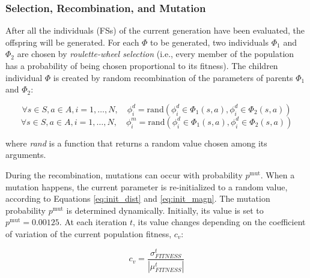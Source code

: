 \documentclass[a4paper]{llncs}
\begin{document}
\subsubsection{Selection, Recombination, and Mutation}
\label{subsubsec:GA_Selection_Recombination_Mutation}
After all the individuals (FSs) of the current generation have been evaluated, the offspring will be generated. For each $\Phi$ to be generated, two individuals $\Phi_1$ and $\Phi_2$ are chosen by \textit{roulette-wheel selection}  (i.e., every member of the population has a probability of being chosen proportional to its fitness). The children individual $\Phi$ is created by random recombination of the parameters of parents $\Phi_1$ and $\Phi_2$:
\begin{small}
\begin{equation}
\forall s \in S, a \in A,  i = 1, \ldots, N, \quad \phi^d_i  = \mathrm{rand}(\phi^d_i \in \Phi_1(s,a), \phi^d_i \in \Phi_2(s,a))
\end{equation}
\begin{equation}
\forall s \in S, a \in A,  i = 1, \ldots, N, \quad \phi^m_i = \mathrm{rand}(\phi^d_i \in \Phi_1(s,a), \phi^d_i \in \Phi_2(s,a))
\end{equation}
\end{small}
where \textit{rand} is a function that returns a random value chosen
among its arguments.

During the recombination, mutations can occur
with probability $p^\mathrm{mut}$. When a mutation happens, the
current parameter is re-initialized to a random value, according to
Equations \ref{eq:init_dist} and \ref{eq:init_magn}.
The mutation probability $p^\mathrm{mut}$ is determined
dynamically. Initially, its value is set to $p^\mathrm{mut} =
0.00125$. At each iteration $t$, its value changes depending on the
coefficient of variation of the current population fitness, $c_v$:
\begin{small}
\begin{equation}
c_v = \frac{\sigma^t_{FITNESS}}{|\mu^t_{FITNESS}|}
\end{equation}
\end{small}
\end{document}
